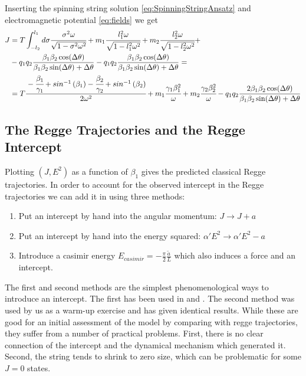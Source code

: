 \documentclass[11pt,a4paper]{article}
\begin{document}
Inserting the spinning string solution \ref{eq:SpinningStringAnsatz} and electromagnetic potential \ref{eq:fields} we get
\begin{align}
J&=T\int_{-l_{2}}^{l_{1}}d\sigma\cfrac{\sigma^{2}\omega}{\sqrt{1-\sigma^{2}\omega^{2}}}+m_1\cfrac{l_{1}^{2}\omega}{\sqrt{1-l_{1}^{2}\omega^{2}}}+m_2\cfrac{l_{2}^{2}\omega}{\sqrt{1-l_{2}^{2}\omega^{2}}}+\notag \\
&-q_{1}q_{2}\frac{\beta_{1}\beta_{2}\cos(\Delta\theta)}{\beta_{1}\beta_{2}\sin(\Delta\theta)+\Delta\theta}-q_{1}q_{2}\frac{\beta_{1}\beta_{2}\cos(\Delta\theta)}{\beta_{1}\beta_{2}\sin(\Delta\theta)+\Delta\theta}=\notag\\
&=T\cfrac{-\cfrac{\beta_{1}}{\gamma_{1}}+sin^{-1}\left(\beta_{1}\right)-\cfrac{\beta_{2}}{\gamma_{2}}+sin^{-1}\left(\beta_{2}\right)}{2\omega^{2}}+m_1\cfrac{\gamma_{1}\beta_{1}^{2}}{\omega}+m_2\cfrac{\gamma_{2}\beta_{2}^{2}}{\omega}-q_{1}q_{2}\frac{2\beta_{1}\beta_{2}\cos(\Delta\theta)}{\beta_{1}\beta_{2}\sin(\Delta\theta)+\Delta\theta}
\end{align} 
\FloatBarrier
 \subsection{The Regge Trajectories and the Regge Intercept}
 \label{sec:regge}
 
Plotting $\left(J,E^{2}\right)$ as a function of $\beta_{1}$ gives the predicted classical Regge trajectories. In order to account for the observed intercept in the Regge trajectories we can add it in using three methods:
\begin{enumerate}
\item Put an intercept by hand into the angular momentum: $J\rightarrow J+a$
\item Put an intercept by hand into the energy squared: $\alpha'E^{2}\rightarrow\alpha'E^{2}-a$
\item Introduce a casimir energy $E_{casimir}=-\frac{\pi}{2}\frac{\tilde{a}}{L}$ which also induces a force and an intercept.
\end{enumerate}

The first and second methods are the simplest phenomenological ways to introduce an intercept. The first has been used in \cite{Sonnenschein14} and \cite{Sonnenschein15}. The second method was used by us as a warm-up exercise and has given identical results. While these are good for an initial assessment of the model by comparing with regge trajectories, they suffer from a number of practical problems. First, there is no clear connection of the intercept and the dynamical mechanism which generated it. Second, the string tends to shrink to zero size, which can be problematic for some $J=0$ states.
\end{document}
